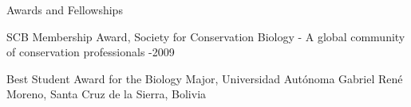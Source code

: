 \documentclass{resume} %
\begin{document}
\begin{rSection}{Awards and Fellowships}
\begin{esSubsection}{SCB Membership Award, }{\normalfont Society for Conservation Biology - A global community of conservation professionals }{-2009}{}{}
\end{esSubsection}

\begin{esSubsection}{Best Student Award for the Biology Major, }{\normalfont Universidad Autónoma Gabriel René Moreno, Santa Cruz de la Sierra, Bolivia}{}{}{}
\end{esSubsection}{}
\end{rSection}


\end{document}
